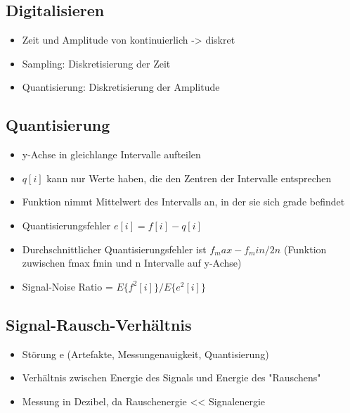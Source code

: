 \documentclass[a4paper,10pt,oneside]{article}
\begin{document}
\subsection{Digitalisieren}
\begin{itemize}
	\item Zeit und Amplitude von kontinuierlich -> diskret
	\item Sampling: Diskretisierung der Zeit
	\item Quantisierung: Diskretisierung der Amplitude
\end{itemize}

\subsection{Quantisierung}
\begin{itemize}
	\item y-Achse in gleichlange Intervalle aufteilen
	\item $q[i]$ kann nur Werte haben, die den Zentren der Intervalle entsprechen
	\item Funktion nimmt Mittelwert des Intervalls an, in der sie sich grade befindet
	\item Quantisierungsfehler $e[i] = f[i] - q[i]$
	\item Durchschnittlicher Quantisierungsfehler ist $f_max-f_min/2n$ (Funktion zuwischen fmax fmin und n Intervalle auf y-Achse)
	\item Signal-Noise Ratio = $E\{f^2[i]\} / E\{e^2[i]\}$
\end{itemize}


\subsection{Signal-Rausch-Verhältnis}
\begin{itemize}
	\item Störung e (Artefakte, Messungenauigkeit, Quantisierung)
	\item Verhältnis zwischen Energie des Signals und Energie des "Rauschens"
	\item Messung in Dezibel, da Rauschenergie << Signalenergie
\end{itemize}
\end{document}
